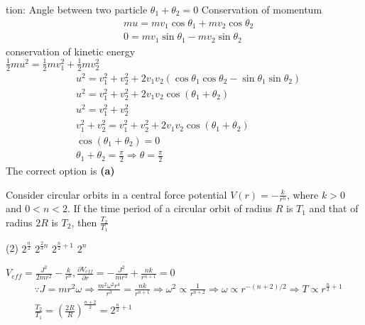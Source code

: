 \begin{enumerate}
\begin{answer}
tion: Angle between two particle $\theta_{1}+\theta_{2}=0$
Conservation of momentum
\begin{align*}
&m u=m v_{1} \cos \theta_{1}+m v_{2} \cos \theta_{2} \\
&0=m v_{1} \sin \theta_{1}-m v_{2} \sin \theta_{2}
\end{align*}
conservation of kinetic energy\\
$
\frac{1}{2} m u^{2}=\frac{1}{2} m v_{1}^{2}+\frac{1}{2} m v_{2}^{2}
$
\begin{align*}
	&u^{2}=v_{1}^{2}+v_{2}^{2}+2 v_{1} v_{2}\left(\cos \theta_{1} \cos \theta_{2}-\sin \theta_{1} \sin \theta_{2}\right) \\
	&u^{2}=v_{1}^{2}+v_{2}^{2}+2 v_{1} v_{2} \cos \left(\theta_{1}+\theta_{2}\right) \\
	&u^{2}=v_{1}^{2}+v_{2}^{2} \\
	&v_{1}^{2}+v_{2}^{2}=v_{1}^{2}+v_{2}^{2}+2 v_{1} v_{2} \cos \left(\theta_{1}+\theta_{2}\right) \\
	&\cos \left(\theta_{1}+\theta_{2}\right)=0 \\
	&\theta_{1}+\theta_{2}=\frac{\pi}{2} \Rightarrow \theta=\frac{\pi}{2}
\end{align*}
The correct option is \textbf{(a)}	
\end{answer}
\begin{minipage}{\textwidth}
	\item Consider circular orbits in a central force potential $V(r)=-\frac{k}{r^{n}}$, where $k>0$ and $0<n<2$. If the time period of a circular orbit of radius $R$ is $T_{1}$ and that of radius $2 R$ is $T_{2}$, then $\frac{T_{2}}{T_{1}}$
\end{minipage}
\begin{tasks}(2)
	\task[\textbf{A.}] $2^{\frac{n}{2}}$
	\task[\textbf{B.}]$2^{\frac{2}{3} n}$
	\task[\textbf{C.}]$2^{\frac{n}{2}+1}$
	\task[\textbf{D.}]$2^{n}$
\end{tasks}
\begin{answer}
	$V_{e f f}=\frac{J^{2}}{2 m r^{2}}-\frac{k}{r^{n}}, \frac{\partial V_{e f f}}{\partial r}=-\frac{J^{2}}{m r^{3}}+\frac{n k}{r^{n+1}}=0$\\
	\begin{align*}
		&\because J=m r^{2} \omega \Rightarrow \frac{m^{2} \omega^{2} r^{4}}{r^{3}}=\frac{n k}{r^{n+1}} \Rightarrow \omega^{2} \propto \frac{1}{r^{n+2}} \Rightarrow \omega \propto r^{-(n+2) / 2} \Rightarrow T \propto r^{\frac{n}{2}+1} \\
		&\frac{T_{2}}{T_{1}}=\left(\frac{2 R}{R}\right)^{\frac{n+2}{2}}=2^{\frac{n}{2}+1}

\end{align*}
\end{answer}
\end{enumerate}

